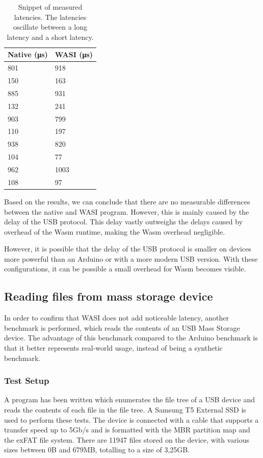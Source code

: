 \begin{table}[h!]
\centering
\begin{tabular}{|l|l|}
\hline
\textbf{Native (μs)} & \textbf{WASI (μs)} \\
\hline
801 & 918 \\
\hline
150 & 163 \\
\hline
885 & 931 \\
\hline
132 & 241 \\
\hline
903 & 799 \\
\hline
110 & 197 \\
\hline
938 & 820 \\
\hline
104 & 77 \\
\hline
962 & 1003 \\
\hline
108 & 97 \\
\hline
\end{tabular}
\caption{Snippet of measured latencies. The latencies oscillate between a long latency and a short latency.}
\label{table:arduino_output}
\end{table}

Based on the results, we can conclude that there are no measurable differences between the native and \acrshort{WASI} program. However, this is mainly caused by the delay of the USB protocol. This delay vastly outweighs the delays caused by overhead of the Wasm runtime, making the Wasm overhead negligible.

However, it is possible that the delay of the USB protocol is smaller on devices more powerful than an Arduino or with a more modern USB version. With these configurations, it can be possible a small overhead for Wasm becomes visible.

\subsection{Reading files from mass storage device}

In order to confirm that WASI does not add noticeable latency, another benchmark is performed, which reads the contents of an USB Mass Storage device. The advantage of this benchmark compared to the Arduino benchmark is that it better represents real-world usage, instead of being a synthetic benchmark.

\subsubsection{Test Setup}
A program has been written which enumerates the file tree of a USB device and reads the contents of each file in the file tree. A Samsung T5 External SSD is used to perform these tests. The device is connected with a cable that supports a transfer speed up to 5Gb/s and is formatted with the \acrshort{MBR} partition map and the \acrshort{exFAT} file system. There are 11947 files stored on the device, with various sizes between 0B and 679MB, totalling to a size of 3,25GB.

